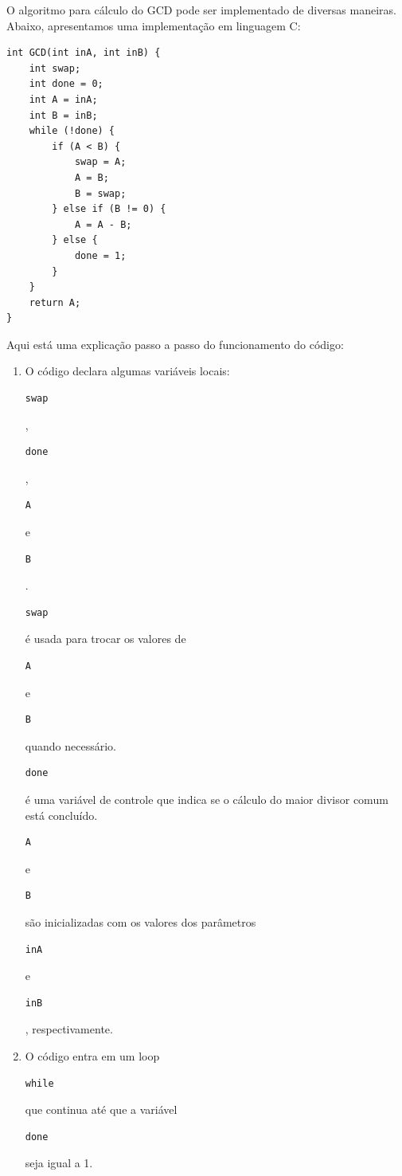 \documentclass[a4paper,11pt]{article} %
\begin{document}
O algoritmo para cálculo do GCD pode ser implementado de diversas maneiras. 
Abaixo, apresentamos uma implementação em linguagem C:

\begin{verbatim}
int GCD(int inA, int inB) {
    int swap;
    int done = 0;
    int A = inA;
    int B = inB;
    while (!done) {
        if (A < B) {
            swap = A;
            A = B;
            B = swap;
        } else if (B != 0) {
            A = A - B;
        } else {
            done = 1;
        }
    }
    return A;
}
\end{verbatim}


Aqui está uma explicação passo a passo do funcionamento do código:

\begin{enumerate}
    \item O código declara algumas variáveis locais: \begin{verbatim}swap\end{verbatim}, \begin{verbatim}done\end{verbatim}, \begin{verbatim}A\end{verbatim} e \begin{verbatim}B\end{verbatim}.
    \begin{verbatim}swap\end{verbatim} é usada para trocar os valores de \begin{verbatim}A\end{verbatim} e \begin{verbatim}B\end{verbatim} quando necessário.
    \begin{verbatim}done\end{verbatim} é uma variável de controle que indica se o cálculo do maior divisor comum está concluído.
    \begin{verbatim}A\end{verbatim} e \begin{verbatim}B\end{verbatim} são inicializadas com os valores dos parâmetros \begin{verbatim}inA\end{verbatim} e \begin{verbatim}inB\end{verbatim}, respectivamente.
    \item O código entra em um loop \begin{verbatim}while\end{verbatim} que continua até que a variável \begin{verbatim}done\end{verbatim} seja igual a 1.

\end{enumerate}
\end{document}
